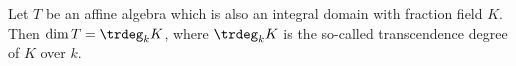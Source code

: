 Let $T$ be an affine algebra which is also an integral domain with fraction field
$K$. Then $\dim T = \trdeg_k K$, where $\trdeg_k K$ is the so-called transcendence
degree of $K$ over $k$.
